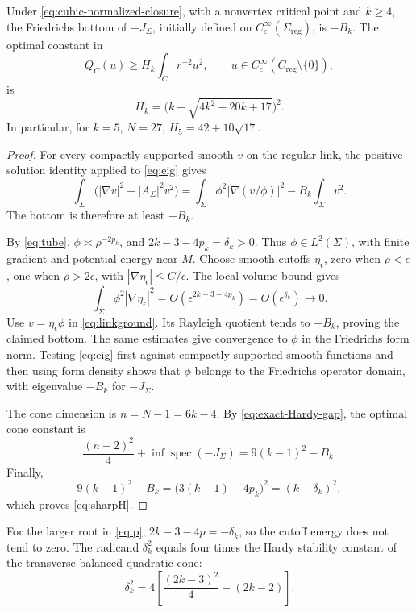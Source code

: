 \begin{theorem}\label{thm:sharp}
Under \eqref{eq:cubic-normalized-closure}, with a nonvertex critical point and \(k\geq4\),
the Friedrichs bottom of \(-J_\Sigma\), initially defined on
\(C_c^\infty(\Sigma_{\mathrm{reg}})\), is \(-B_k\).
The optimal constant in
\[
 Q_C(u)\geq H_k\int_Cr^{-2}u^2,
 \qquad u\in C_c^\infty(C_{\mathrm{reg}}\setminus\{0\}),
\]
is
\begin{equation}\label{eq:sharpH}
 \boxed{H_k=\bigl(k+\sqrt{4k^2-20k+17}\bigr)^2.}
\end{equation}
In particular, for \(k=5\), \(N=27\), \(H_5=42+10\sqrt{17}\).
\end{theorem}

\begin{proof}
For every compactly supported smooth \(v\) on the regular link,
the positive-solution identity applied to \eqref{eq:eig} gives
\begin{equation}\label{eq:linkground}
 \int_\Sigma\bigl(|\nabla v|^2-|A_\Sigma|^2v^2\bigr)
 =\int_\Sigma\phi^2\left|\nabla(v/\phi)\right|^2-B_k\int_\Sigma v^2.
\end{equation}
The bottom is therefore at least \(-B_k\).

By \eqref{eq:tube}, \(\phi\asymp\rho^{-2p_k}\), and \(2k-3-4p_k=\delta_k>0\).
Thus \(\phi\in L^2(\Sigma)\), with finite gradient and potential
energy near \(M\). Choose smooth cutoffs \(\eta_\epsilon\), zero
when \(\rho<\epsilon\), one when \(\rho>2\epsilon\), with
\(|\nabla\eta_\epsilon|\leq C/\epsilon\). The local volume bound gives
\[
 \int_\Sigma\phi^2|\nabla\eta_\epsilon|^2
 =O(\epsilon^{2k-3-4p_k})=O(\epsilon^{\delta_k})\longrightarrow0.
\]
Use \(v=\eta_\epsilon\phi\) in \eqref{eq:linkground}. Its Rayleigh
quotient tends to \(-B_k\), proving the claimed bottom.
The same estimates give convergence to \(\phi\) in the Friedrichs
form norm. Testing \eqref{eq:eig} first against compactly supported
smooth functions and then using form density shows that \(\phi\)
belongs to the Friedrichs operator domain, with eigenvalue \(-B_k\)
for \(-J_\Sigma\).

The cone dimension is \(n=N-1=6k-4\).  By
\eqref{eq:exact-Hardy-gap}, the optimal cone constant is
\[
 \frac{(n-2)^2}{4}+\inf\operatorname{spec}(-J_\Sigma)
 =9(k-1)^2-B_k.
\]
Finally,
\[
 9(k-1)^2-B_k
 =\bigl(3(k-1)-4p_k\bigr)^2=(k+\delta_k)^2,
\]
which proves \eqref{eq:sharpH}.
\end{proof}

\begin{remark}
For the larger root in \eqref{eq:p},
\(2k-3-4p=-\delta_k\), so the cutoff energy does not tend to zero.
The radicand \(\delta_k^2\) equals four times the Hardy stability
constant of the transverse balanced quadratic cone:
\[
 \delta_k^2=4\left[\frac{(2k-3)^2}{4}-(2k-2)\right].
\]
\end{remark}
